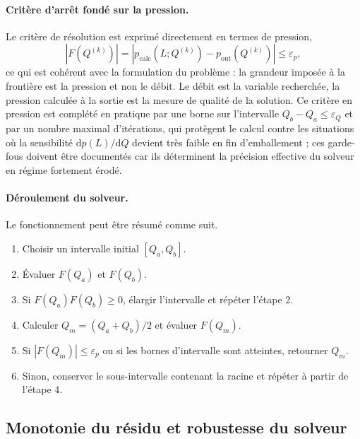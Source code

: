\documentclass[11pt,a4paper]{report}
\begin{document}
\paragraph{Critère d'arrêt fondé sur la pression.} Le critère de résolution est exprimé directement en
termes de pression,
\begin{equation}
\left|F(Q^{(k)})\right| = \left|p_{\mathrm{calc}}(L;Q^{(k)}) - p_{\mathrm{out}}(Q^{(k)})\right|
\le \varepsilon_p ,
\label{eq:tol-p}
\end{equation}
ce qui est cohérent avec la formulation du problème : la grandeur imposée à la frontière est la pression et
non le débit. Le débit est la variable recherchée, la pression calculée à la sortie est la mesure de
qualité de la solution. Ce critère en pression est complété en pratique par une borne sur l'intervalle
\(Q_b-Q_a \le \varepsilon_Q\) et par un nombre maximal d'itérations, qui protègent le calcul contre les
situations où la sensibilité \(\mathrm{d}p(L)/\mathrm{d}Q\) devient très faible en fin d'emballement ; ces
garde-fous doivent être documentés car ils déterminent la précision effective du solveur en régime
fortement érodé.

\paragraph{Déroulement du solveur.} Le fonctionnement peut être résumé comme suit.
\begin{enumerate}[label=\arabic*.]
  \item Choisir un intervalle initial \([Q_a, Q_b]\).
  \item Évaluer \(F(Q_a)\) et \(F(Q_b)\).
  \item Si \(F(Q_a)F(Q_b) \ge 0\), élargir l'intervalle et répéter l'étape 2.
  \item Calculer \(Q_m = (Q_a+Q_b)/2\) et évaluer \(F(Q_m)\).
  \item Si \(|F(Q_m)| \le \varepsilon_p\) ou si les bornes d'intervalle sont atteintes, retourner \(Q_m\).
  \item Sinon, conserver le sous-intervalle contenant la racine et répéter à partir de l'étape 4.
\end{enumerate}

\subsection{Monotonie du résidu et robustesse du solveur}
\label{sec:robustesse}
\end{document}

